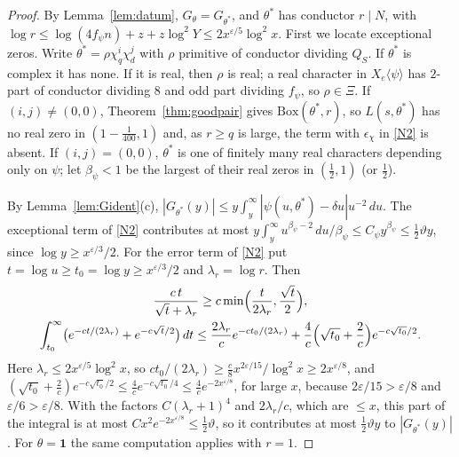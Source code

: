 \documentclass[11pt]{amsart}
\newcommand{\eps}{\varepsilon}
\theoremstyle{plain}
\theoremstyle{definition}
\numberwithin{equation}{section}
\begin{document}
\begin{proof}
By Lemma~\ref{lem:datum}, $G_\theta=G_{\theta^\ast}$, and $\theta^\ast$ has conductor $r\mid N$, with
$\log r\le\log(4f_\psi n)+z+z\log^2Y\le2x^{\eps/5}\log^2x$. First we locate exceptional zeros. Write
$\theta^\ast=\rho\chi_q^i\chi_d^j$ with $\rho$ primitive of conductor dividing $Q_S$. If $\theta^\ast$
is complex it has none. If it is real, then $\rho$ is real; a real character in $X_e\langle\psi\rangle$
has $2$-part of conductor dividing $8$ and odd part dividing $f_\psi$, so $\rho\in\Xi$. If
$(i,j)\ne(0,0)$, Theorem~\ref{thm:goodpair} gives $\mathrm{Box}(\theta^\ast,r)$, so $L(s,\theta^\ast)$
has no real zero in $(1-\frac1{400},1)$ and, as $r\ge q$ is large, the term with $\epsilon_\chi$ in
\ref{N2} is absent. If $(i,j)=(0,0)$, $\theta^\ast$ is one of finitely
many real characters depending only on $\psi$; let $\beta_\psi<1$ be the largest of their real zeros
in $(\frac12,1)$ (or $\frac12$).

By Lemma~\ref{lem:Gident}(c), $|G_{\theta^\ast}(y)|\le y\int_y^\infty|\psi(u,\theta^\ast)-\delta u|u^{-2}\,du$.
The exceptional term of \ref{N2} contributes at most
$y\int_y^\infty u^{\beta_\psi-2}\,du/\beta_\psi\le C_\psi y^{\beta_\psi}\le\frac12\vartheta y$, since
$\log y\ge x^{\eps/3}/2$. For the error term of \ref{N2} put $t=\log u\ge t_0=\log y\ge x^{\eps/3}/2$
and $\lambda_r=\log r$. Then
\begin{gather*}
\frac{c\,t}{\sqrt t+\lambda_r}\ge c\min\Bigl(\frac t{2\lambda_r},\frac{\sqrt t}2\Bigr),\\
\int_{t_0}^\infty\bigl(e^{-ct/(2\lambda_r)}+e^{-c\sqrt t/2}\bigr)\,dt\le\frac{2\lambda_r}ce^{-ct_0/(2\lambda_r)}+\frac4c\Bigl(\sqrt{t_0}+\frac2c\Bigr)e^{-c\sqrt{t_0}/2}.
\end{gather*}
Here $\lambda_r\le2x^{\eps/5}\log^2x$, so $ct_0/(2\lambda_r)\ge\frac c8x^{2\eps/15}/\log^2x\ge2x^{\eps/8}$,
and $(\sqrt{t_0}+\frac2c)e^{-c\sqrt{t_0}/2}\le\frac4ce^{-c\sqrt{t_0}/4}\le\frac4ce^{-2x^{\eps/8}}$, for large
$x$, because $2\eps/15>\eps/8$ and $\eps/6>\eps/8$. With the factors $C(\lambda_r+1)^4$ and
$2\lambda_r/c$, which are $\le x$, this part of the integral is at most $Cx^2e^{-2x^{\eps/8}}\le\frac12\vartheta$, so it contributes at
most $\frac12\vartheta y$ to $|G_{\theta^\ast}(y)|$. For $\theta=\mathbf1$ the same computation applies with $r=1$.
\end{proof}
\end{document}
